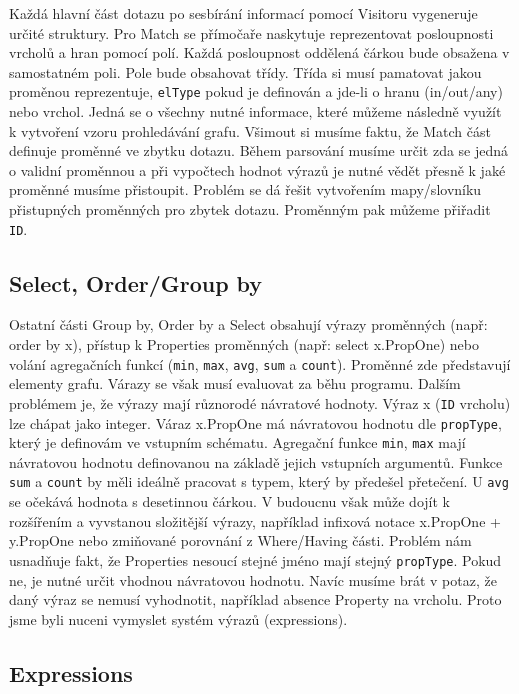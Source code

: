 Každá hlavní část dotazu po sesbírání informací pomocí Visitoru vygeneruje určité struktury.
Pro Match se přímočaře naskytuje reprezentovat posloupnosti vrcholů a hran pomocí polí.
Každá posloupnost oddělená čárkou bude obsažena v samostatném poli.
Pole bude obsahovat třídy.
Třída si musí pamatovat jakou proměnou reprezentuje, \verb+elType+ pokud je definován a jde-li o hranu (in/out/any) nebo vrchol.
Jedná se o všechny nutné informace, které můžeme následně využít k vytvoření vzoru prohledávání grafu.
Všimout si musíme faktu, že Match část definuje proměnné ve zbytku dotazu.
Během parsování musíme určit zda se jedná o validní proměnnou a při vypočtech hodnot výrazů je nutné vědět přesně k jaké proměnné musíme přistoupit.
Problém se dá řešit vytvořením mapy/slovníku přistupných proměnných pro zbytek dotazu.
Proměnným pak můžeme přiřadit \verb+ID+.

\subsection{Select, Order/Group by}

Ostatní části Group by, Order by a Select obsahují výrazy proměnných (např: order by x), přístup k Properties proměnných (např: select x.PropOne) nebo volání agregačních funkcí (\verb+min+, \verb+max+, \verb+avg+, \verb+sum+ a \verb+count+).
Proměnné zde představují elementy grafu.
Várazy se však musí evaluovat za běhu programu.
Dalším problémem je, že výrazy mají různorodé návratové hodnoty.
Výraz x (\verb+ID+ vrcholu) lze chápat jako integer.
Váraz x.PropOne má návratovou hodnotu dle \verb+propType+, který je definovám ve vstupním schématu.
Agregační funkce \verb+min+, \verb+max+ mají návratovou hodnotu definovanou na základě jejich vstupních argumentů.
Funkce \verb+sum+ a \verb+count+ by měli ideálně pracovat s typem, který by předešel přetečení.
U \verb+avg+ se očekává hodnota s desetinnou čárkou.  
V budoucnu však může dojít k rozšířením a vyvstanou složitější výrazy, například infixová notace x.PropOne + y.PropOne nebo zmiňované porovnání z Where/Having části.
Problém nám usnadňuje fakt, že Properties nesoucí stejné jméno mají stejný \verb+propType+.
Pokud ne, je nutné určit vhodnou návratovou hodnotu.
Navíc musíme brát v potaz, že daný výraz se nemusí vyhodnotit, například absence Property na vrcholu.
Proto jsme byli nuceni vymyslet systém výrazů (expressions).

\subsection{Expressions}

